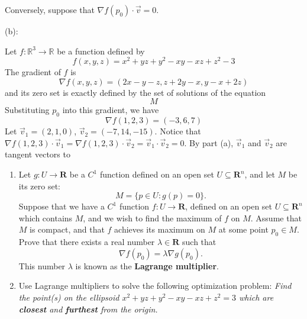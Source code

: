 \documentclass{article}
\newcommand{\R}{\mathbf{R}}
\theoremstyle{plain} %
\numberwithin{thm}{section} %
\theoremstyle{definition}
\begin{document}
\begin{question}{32}
        \medskip

        Conversely, suppose that \(\nabla f(p_0) \cdot \vec{v} = 0\).

        \medskip

        \noindent(b):

        Let \(f: \mathbb{R}^3 \to \mathbb{R}\) be a function defined by
        \[
            f(x,y,z) = x^2 + yz + y^2 - xy -xz + z^2 - 3
        \]
        The gradient of \(f\) is
        \[
            \nabla f(x,y,z) = (2x - y - z, z + 2y - x, y - x + 2z)
        \]
        and its zero set is exactly defined by the set of solutions of the equation
        \[
            M
        \]
        Substituting \(p_0\) into this gradient, we have
        \[
            \nabla f(1,2,3) = (-3, 6, 7)
        \]
        Let \(\vec{v}_1 = (2, 1, 0)\), \(\vec{v}_2 = (-7, 14, -15)\). Notice that \(\nabla f(1,2,3) \cdot \vec{v}_1 = \nabla f(1,2,3) \cdot \vec{v}_2 = \vec{v}_1 \cdot \vec{v}_2 = 0\). By part (a), \(\vec{v}_1\) and \(\vec{v}_2\) are tangent vectors to 
    \end{question}
	\newpage
	\begin{question}{33}
		\begin{enumerate}[label=(\alph*)]
            \item Let $g:U\rightarrow \R$ be a $C^1$ function defined on an open set $U\subseteq \R^n$, and let $M$ be its zero set:
                \[ M = \{ p\in U : g(p)=0 \}. \]
            Suppose that we have a $C^1$ function $f:U\rightarrow \R$, defined on an open set $U\subseteq \R^n$ which contains $M$, and we wish to find the maximum of $f$ on $M$. Assume that $M$ is compact, and that $f$ achieves its maximum on $M$ at some point $p_0\in M$. Prove that there exists a real number $\lambda \in \R$ such that
                \[ \nabla f(p_0) = \lambda \nabla g(p_0). \]
            This number $\lambda$ is known as the \textbf{Lagrange multiplier}.
    
            \item Use Lagrange multipliers to solve the following optimization problem: \textit{Find the point(s) on the ellipsoid $x^2 + yz + y^2 - xy - xz + z^2 = 3$ which are \textbf{closest} and \textbf{furthest} from the origin.}
        \end{enumerate}
	\end{question}
\end{document}

